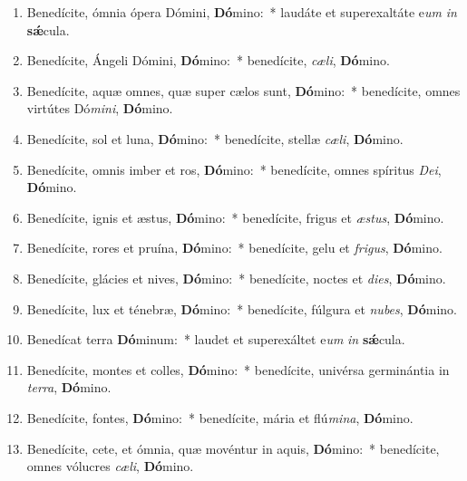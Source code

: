 \documentclass[twoside]{article}
\begin{document}
\begin{paracol}[1]{2}
\begin{enumerate}[wide, itemsep=0mm, labelwidth=!, labelindent=0pt, label=\color{gregoriocolor}\theenumi]
\item Benedícite, ómnia ópera Dómini, \textbf{Dó}mino:~* laudáte et superexaltáte e\textit{um} \textit{in} \textbf{sǽ}cula.

\item Benedícite, Ángeli Dómini, \textbf{Dó}mino:~* benedícite, \textit{cæ}\textit{li}, \textbf{Dó}mino.

\item Benedícite, aquæ omnes, quæ super cælos sunt, \textbf{Dó}mino:~* benedícite, omnes virtútes Dó\textit{mi}\textit{ni}, \textbf{Dó}mino.

\item Benedícite, sol et luna, \textbf{Dó}mino:~* benedícite, stellæ \textit{cæ}\textit{li}, \textbf{Dó}mino.

\item Benedícite, omnis imber et ros, \textbf{Dó}mino:~* benedícite, omnes spíritus \textit{De}\textit{i}, \textbf{Dó}mino.

\item Benedícite, ignis et æstus, \textbf{Dó}mino:~* benedícite, frigus et \textit{æs}\textit{tus}, \textbf{Dó}mino.

\item Benedícite, rores et pruína, \textbf{Dó}mino:~* benedícite, gelu et \textit{fri}\textit{gus}, \textbf{Dó}mino.

\item Benedícite, glácies et nives, \textbf{Dó}mino:~* benedícite, noctes et \textit{di}\textit{es}, \textbf{Dó}mino.

\item Benedícite, lux et ténebræ, \textbf{Dó}mino:~* benedícite, fúlgura et \textit{nu}\textit{bes}, \textbf{Dó}mino.

\item Benedícat terra \textbf{Dó}minum:~* laudet et superexáltet e\textit{um} \textit{in} \textbf{sǽ}cula.

\item Benedícite, montes et colles, \textbf{Dó}mino:~* benedícite, univérsa germinántia in \textit{ter}\textit{ra}, \textbf{Dó}mino.

\item Benedícite, fontes, \textbf{Dó}mino:~* benedícite, mária et flú\textit{mi}\textit{na}, \textbf{Dó}mino.

\item Benedícite, cete, et ómnia, quæ movéntur in aquis, \textbf{Dó}mino:~* benedícite, omnes vólucres \textit{cæ}\textit{li}, \textbf{Dó}mino.


\end{enumerate}
\end{paracol}
\end{document}
